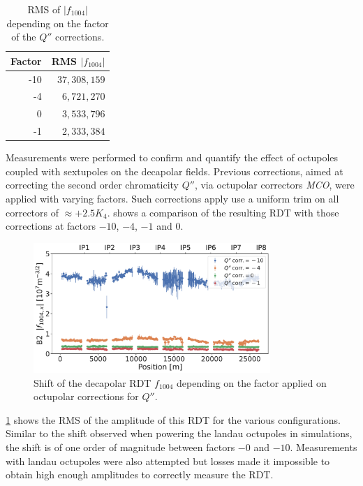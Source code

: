 \begin{table}
    \centering
    \begin{tabular}{rr}
    \toprule
    Factor & RMS $|f_{1004}|$ \\
    \midrule
       -10 & $37,308,159$         \\ 
        -4 &  $6,721,270$          \\ 
         0 &  $3,533,796$          \\ 
        -1 &  $2,333,384$          \\
    \bottomrule
    \end{tabular}
    \caption{RMS of $|f_{1004}|$ depending on the factor of the $Q''$ corrections.}
    \label{table:decapoles:corrections_dq2_f1004_rms}
\end{table}

Measurements were performed to confirm and quantify the effect of octupoles coupled with sextupoles
on the decapolar fields. Previous corrections, aimed at correcting the second order chromaticity
$Q''$, via octupolar correctors \textit{MCO}, were applied with varying factors. Such corrections
apply use a uniform trim on all correctors of $\approx +2.5K_4$.
 shows a comparison of the resulting RDT with those
corrections at factors $-10$, $-4$, $-1$ and $0$.

\begin{figure}[!htb]
    \centering
    \includegraphics[width=0.8\textwidth]{./images/f1004/f1004x_mco_corr.pdf}
    \caption{Shift of the decapolar RDT $f_{1004}$ depending on the factor applied on octupolar
    corrections for $Q''$.}
    \label{decapoles:rdts:measured_f1004_mco}
\end{figure}


  
\cref{table:decapoles:corrections_dq2_f1004_rms} shows the RMS of the amplitude of this RDT for the 
various configurations. Similar to the shift observed when powering the landau octupoles in
simulations, the shift is of one order of magnitude between factors $-0$ and $-10$. Measurements
with landau octupoles were also attempted but losses made it impossible to obtain high enough
amplitudes to correctly measure the RDT.

